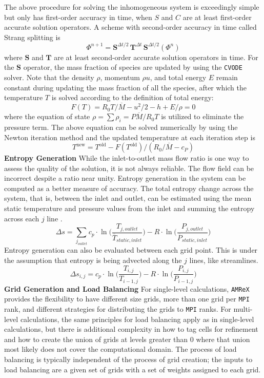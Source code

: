 \documentclass{homework}
\begin{document}
The above procedure for solving the inhomogeneous system is exceedingly simple but only has first-order accuracy in time, when $S$ and $C$ are at least first-order accurate solution operators. A scheme with second-order accuracy in time called Strang splitting is 
$$\Phi^{n+1} = \textbf{S}^{\Delta t / 2} \, \textbf{T}^{\Delta t} \, \textbf{S}^{\Delta t / 2} (\Phi^n)$$
where $\textbf{S}$ and $\textbf{T}$ are at least second-order accurate solution operators in time.
For the $\textbf{S}$ operator, the mass fraction of species are updated by using the \texttt{CVODE} solver. Note that the density $\rho$, momentum $\rho u$, and total energy $E$ remain constant during updating the mass fraction of all the species, after which the temperature $T$ is solved according to the definition of total energy:
$$F(T) = R_0 T / \overline{M} - u^2 / 2 - h + E / \rho = 0$$
where the equation of state $\rho = \sum \rho_i = P \overline{M} / R_0 T$ is utilized to eliminate the pressure term. The above equation can be solved numerically by using the Newton iteration method and the
updated temperature at each iteration step is
$$T^\textrm{new} = T^\textrm{old} - F(T^\textrm{old})/(R_0 / \overline{M} - c_P)$$
\textbf{Entropy Generation}
While the inlet-to-outlet mass flow ratio is one way to assess the quality of the solution, it is not always reliable. The flow field can be incorrect despite a ratio near unity. Entropy generation in the system can be computed as a better measure of accuracy.  The total entropy change across the system, that is, between the inlet and outlet, can be estimated using the mean static temperature and pressure values from the inlet and summing the entropy across each $j$ line \cite{Tucker2016}.
\begin{equation*}
    \Delta s = \sum_{j_{outlet}} c_p \cdot \ln{\Big(\frac{T_{j,outlet}}{\overline{T}_{static,inlet}}\Big)} - R \cdot \ln{\Big(\frac{P_{j,outlet}}{\overline{P}_{static,inlet}}\Big)}
\end{equation*}
Entropy generation can also be evaluated between each grid point. This is under the assumption that entropy is being advected along the $j$ lines, like streamlines.
\begin{equation*}
\label{eq:entropy_grid}
    \Delta s_{i,j} = c_p \cdot \ln{\Big(\frac{T_{i,j}}{T_{i-1,j}}\Big)} - R \cdot \ln{\Big(\frac{P_{i,j}}{P_{i-1,j}}\Big)}
\end{equation*}
\textbf{Grid Generation and Load Balancing} For single-level calculations, \texttt{AMReX} provides the flexibility to have different size grids, more than one grid per \texttt{MPI} rank, and different strategies for distributing the grids to \texttt{MPI} ranks. For multi-level calculations, the same principles for load balancing apply as in single-level calculations, but there is additional complexity in how to tag cells for refinement and how to create the union of grids at levels greater than 0 where that union most likely does not cover the computational domain. The process of load balancing is typically independent of the process of grid creation; the inputs to load balancing are a given set of grids with a set of weights assigned to each grid.
\end{document}
